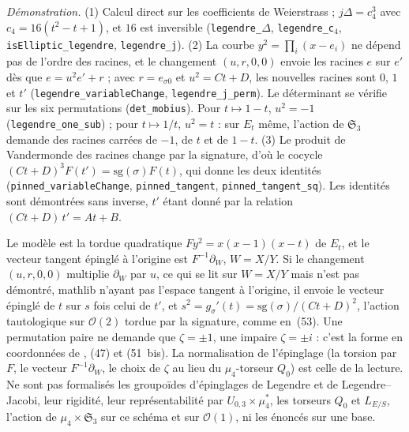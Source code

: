 {\small \emph{Démonstration.} (1) Calcul direct sur les coefficients de Weierstrass ; $j\Delta = c_4^3$ avec $c_4 = 16(t^2 - t + 1)$, et $16$ est inversible (\texttt{legendre\_$\Delta$}, \texttt{legendre\_c$_4$}, \texttt{isElliptic\_legendre}, \texttt{legendre\_j}). (2) La courbe $y^2 = \prod_i (x - e_i)$ ne dépend pas de l'ordre des racines, et le changement $(u, r, 0, 0)$ envoie les racines $e$ sur $e'$ dès que $e = u^2 e' + r$ ; avec $r = e_{\sigma 0}$ et $u^2 = Ct + D$, les nouvelles racines sont $0$, $1$ et $t'$ (\texttt{legendre\_variableChange}, \texttt{legendre\_j\_perm}). Le déterminant se vérifie sur les six permutations (\texttt{det\_mobius}). Pour $t \mapsto 1 - t$, $u^2 = -1$ (\texttt{legendre\_one\_sub}) ; pour $t \mapsto 1/t$, $u^2 = t$ : sur $E_t$ même, l'action de $\mathfrak S_3$ demande des racines carrées de $-1$, de $t$ et de $1 - t$. (3) Le produit de Vandermonde des racines change par la signature, d'où le cocycle $(Ct + D)^3 F(t') = \mathrm{sg}(\sigma) F(t)$, qui donne les deux identités (\texttt{pinned\_variableChange}, \texttt{pinned\_tangent}, \texttt{pinned\_tangent\_sq}). Les identités sont démontrées sans inverse, $t'$ étant donné par la relation $(Ct + D)\,t' = At + B$.

Le modèle est la tordue quadratique $F y^2 = x(x - 1)(x - t)$ de $E_t$, et le vecteur tangent épinglé à l'origine est $F^{-1}\partial_W$, $W = X/Y$. Si le changement $(u, r, 0, 0)$ multiplie $\partial_W$ par $u$, ce qui se lit sur $W = X/Y$ mais n'est pas démontré, mathlib n'ayant pas l'espace tangent à l'origine, il envoie le vecteur épinglé de $t$ sur $s$ fois celui de $t'$, et $s^2 = g_\sigma'(t) = \mathrm{sg}(\sigma)/(Ct + D)^2$, l'action tautologique sur $\mathcal O(2)$ tordue par la signature, comme en~(53). Une permutation paire ne demande que $\zeta = \pm 1$, une impaire $\zeta = \pm i$ : c'est la forme en coordonnées de , (47) et (51~bis). La normalisation de l'épinglage (la torsion par $F$, le vecteur $F^{-1}\partial_W$, le choix de $\zeta$ au lieu du $\mu_4$-torseur $Q_0$) est celle de la lecture. Ne sont pas formalisés les groupoïdes d'épinglages de Legendre et de Legendre--Jacobi, leur rigidité, leur représentabilité par $U_{0,3} \times \mu_4^*$, les torseurs $Q_0$ et $L_{E/S}$, l'action de $\mu_4 \times \mathfrak S_3$ sur ce schéma et sur $\mathcal O(1)$, ni les énoncés sur une base.\par}
